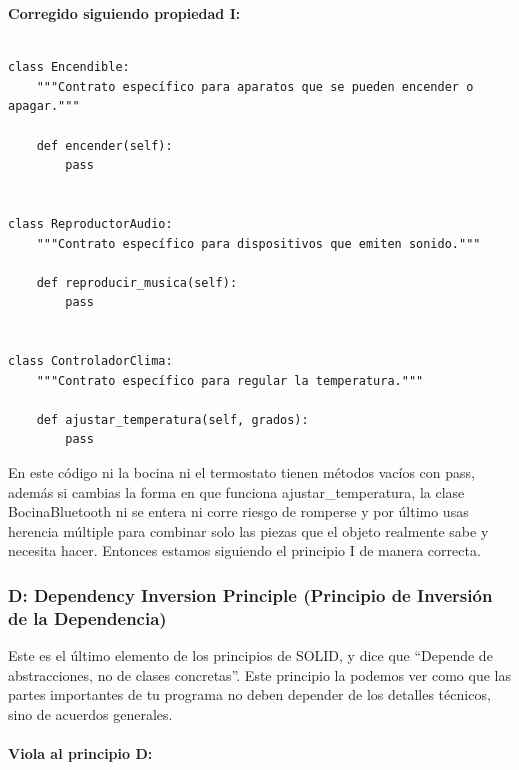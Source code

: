 \documentclass{article}
\begin{document}
        		\textbf{Corregido siguiendo propiedad I:}
        		\begin{verbatim}

class Encendible:
    """Contrato específico para aparatos que se pueden encender o apagar."""

    def encender(self):
        pass


class ReproductorAudio:
    """Contrato específico para dispositivos que emiten sonido."""

    def reproducir_musica(self):
        pass


class ControladorClima:
    """Contrato específico para regular la temperatura."""

    def ajustar_temperatura(self, grados):
        pass

        		\end{verbatim}
        		En este código ni la bocina ni el termostato tienen métodos vacíos con pass, además si cambias la forma en que 
				funciona ajustar\_temperatura, la clase BocinaBluetooth ni se entera ni corre riesgo de romperse y por último usas
				 herencia múltiple para combinar solo las piezas que el objeto realmente sabe y necesita hacer. Entonces estamos 
				 siguiendo el principio I de manera correcta.
   
	
    		\subsubsection*{D: Dependency Inversion Principle (Principio de Inversión de la Dependencia)}
        		Este es el último elemento de los principios de SOLID, y dice que “Depende de abstracciones, no de clases concretas”. Este principio la podemos ver como que las partes importantes de tu programa no deben depender de los detalles técnicos, sino de acuerdos generales.\\ \\

        		\textbf{Viola al principio D:}
\end{document}
